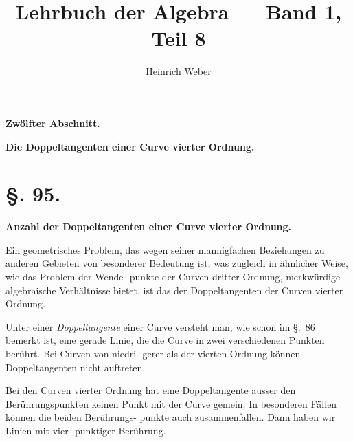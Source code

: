 \documentclass[12pt,a4paper]{article}
\title{Lehrbuch der Algebra --- Band 1, Teil 8}
\author{Heinrich Weber}
\date{}
\theoremstyle{definition}
\begin{document}
\maketitle
\thispagestyle{empty}

\begin{center}
\Large\textbf{Zwölfter Abschnitt.}

\medskip
\Large\textbf{Die Doppeltangenten einer Curve vierter Ordnung.}
\end{center}

\bigskip

\section*{\S. 95.}

\begin{center}
\textbf{Anzahl der Doppeltangenten einer Curve vierter Ordnung.}
\end{center}

Ein geometrisches Problem, das wegen seiner mannigfachen
Beziehungen zu anderen Gebieten von besonderer Bedeutung ist,
was zugleich in ähnlicher Weise, wie das Problem der Wende-
punkte der Curven dritter Ordnung, merkwürdige algebraische
Verhältnisse bietet, ist das der Doppeltangenten der Curven
vierter Ordnung.

Unter einer \textit{Doppeltangente} einer Curve versteht man,
wie schon im \S.~86 bemerkt ist, eine gerade Linie, die die Curve
in zwei verschiedenen Punkten berührt. Bei Curven von niedri-
gerer als der vierten Ordnung können Doppeltangenten nicht
auftreten.

Bei den Curven vierter Ordnung hat eine Doppeltangente
ausser den Berührungspunkten keinen Punkt mit der Curve
gemein. In besonderen Fällen können die beiden Berührungs-
punkte auch zusammenfallen. Dann haben wir Linien mit vier-
punktiger Berührung.
\end{document}
